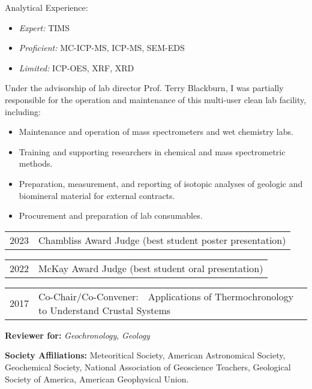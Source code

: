 Analytical Experience:
	\begin{itemize} [label={}]
		\item \textit{Expert:} TIMS
		\item \textit{Proficient:} MC-ICP-MS, ICP-MS, SEM-EDS
		\item \textit{Limited:} ICP-OES, XRF, XRD
	\end{itemize} 
Under the advisorship of lab director Prof. Terry Blackburn, I was partially responsible for the operation and maintenance of this multi-user clean lab facility, including:
	\begin{itemize} 
	\item Maintenance and operation of mass spectrometers and wet chemistry labs.
	\item Training and supporting researchers in chemical and mass spectrometric methods.
	\item Preparation, measurement, and reporting of isotopic analyses of geologic and biomineral material for external contracts.
	\item Procurement and preparation of lab consumables.
	\end{itemize}

\begin{tabular}{ll} 
	2023 & Chambliss Award Judge (best student poster presentation)
\end{tabular}

\begin{tabular}{ll} 
	2022 & 	McKay Award Judge (best student oral presentation)
\end{tabular}

\begin{tabular}{ll} 
	2017 & 	Co-Chair/Co-Convener:~~Applications of Thermochronology to Understand Crustal Systems
\end{tabular}

\vspace{2ex}
\begin{hangparas}{5ex}{1}
	\textbf{Reviewer for:} \textit{Geochronology}, \textit{Geology}

	\vspace{2ex}
	\textbf{Society Affiliations:} Meteoritical Society, American Astronomical Society, Geochemical Society, National Association of Geoscience Teachers, Geological Society of America, American Geophysical Union.
\end{hangparas}